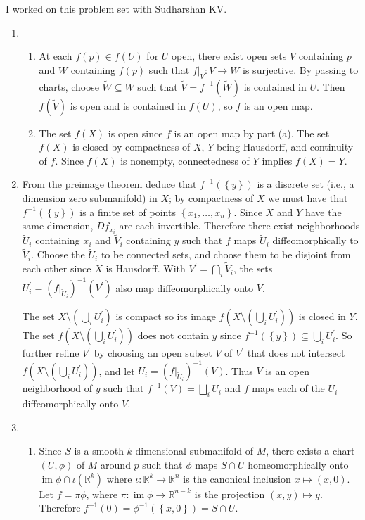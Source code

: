 \documentclass[11pt,leqno]{article}
\theoremstyle{plain}
\theoremstyle{definition}
\numberwithin{equation}{section}
\numberwithin{lem}{section}
\newcommand{\cbr}[1]{\left\{#1\right\}}
\DeclareMathOperator{\im}{im}
\begin{document}
I worked on this problem set with Sudharshan KV.
\begin{enumerate}
    \item \begin{enumerate}
      \item At each $f(p)\in f(U)$ for $U$ open, there exist open sets $V$ containing $p$ and $W$ containing $f(p)$ such that $f|_V\colon V\to W$ is surjective. By passing to charts, choose $\tilde W\subseteq W$ such that $\tilde V = f^{-1}(\tilde W)$ is contained in $U$. Then $f(\tilde V)$ is open and is contained in $f(U)$, so $f$ is an open map.
      \item The set $f(X)$ is open since $f$ is an open map by part (a). The set $f(X)$ is closed by compactness of $X$, $Y$ being Hausdorff, and continuity of $f$. Since $f(X)$ is nonempty, connectedness of $Y$ implies $f(X) = Y$.
    \end{enumerate}
    \item From the preimage theorem deduce that $f^{-1}(\cbr{y})$ is a discrete set (i.e., a dimension zero submanifold) in $X$; by compactness of $X$ we must have that $f^{-1}(\cbr{y})$ is a finite set of points $\cbr{x_1,\dots,x_n}$. Since $X$ and $Y$ have the same dimension, $Df_{x_i}$ are each invertible. Therefore there exist neighborhoods $\tilde U_i$ containing $x_i$ and $\tilde V_i$ containing $y$ such that $f$ maps $\tilde U_i$ diffeomorphically to $\tilde V_i$. Choose the $\tilde U_i$ to be connected sets, and choose them to be disjoint from each other since $X$ is Hausdorff. With $V^\prime = \bigcap_i \tilde V_i$, the sets $U_i^\prime = (f|_{\tilde U_i})^{-1}(V^\prime)$ also map diffeomorphically onto $V$. 
    
    The set $X\setminus (\bigcup_iU_i^\prime)$ is compact so its image $f(X\setminus (\bigcup_iU_i^\prime))$ is closed in $Y$. The set $f(X\setminus (\bigcup_iU_i^\prime))$ does not contain $y$ since $f^{-1}(\cbr{y})\subseteq \bigcup_iU_i^\prime$. So further refine $V^\prime$ by choosing an open subset $V$ of $V^\prime$ that does not intersect $f(X\setminus (\bigcup_iU_i^\prime))$, and let $U_i = (f|_{\tilde U_i})^{-1}(V)$. Thus $V$ is an open neighborhood of $y$ such that $f^{-1}(V) = \bigsqcup_i U_i$ and $f$ maps each of the $U_i$ diffeomorphically onto $V$.
    \item \begin{enumerate}
      \item Since $S$ is a smooth $k$-dimensional submanifold of $M$, there exists a chart $(U,\phi)$ of $M$ around $p$ such that $\phi$ maps $S\cap U$ homeomorphically onto $\im \phi\cap \iota(\mathbb R^k)$ where $\iota\colon \mathbb R^k\to \mathbb R^n$ is the canonical inclusion $x\mapsto (x,0)$. Let $f = \pi\phi$, where $\pi\colon \im \phi \to \mathbb R^{n-k}$ is the projection $(x,y)\mapsto y$. Therefore $f^{-1}(0) = \phi^{-1}(\cbr{x,0}) = S\cap U$.
    

\end{enumerate}
\end{enumerate}
\end{document}
